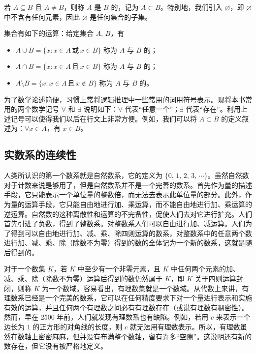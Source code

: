 \documentclass[UTF8,12pt,a4paper,fontset=fandol]{ctexbook}
\begin{document}
若 $A\subseteq B$ 且 $A\ne B$，则称 $A$ 是 $B$ 的，记为 $A\subset B$。特别地，我们引入 $\varnothing$，即 $\varnothing$ 中不含有任何元素，因此 $\varnothing$ 是任何集合的子集。


集合有如下的运算：给定集合 $A,\, B$，有
\begin{itemize}
  \item $A\cup B=\{x:x\in A \,\text{或}\, x\in B\}$ 称为 $A$ 与 $B$ 的；
  \item $A\cap B=\{x:x\in A\,\text{且}\,x\in B\}$ 称为 $A$ 与 $B$ 的；
  \item $A\setminus B=\{x:x\in A\,\text{且}\,x\notin B\}$ 称为 $A$ 与 $B$ 的。
\end{itemize}


为了数学论述简便，习惯上常将逻辑推理中一些常用的词用符号表示。现将本书常用的两个数学记号 $\forall$ 和 $\exists$ 说明如下：$\forall$ 代表“任意一个”；$\exists$ 代表“存在”。利用上述记号可以使得我们以后在行文上非常方便。例如，我们可以将 $A\subset B$ 的定义叙述为：$\forall x\in A$，有 $x\in B$。


\subsection{实数系的连续性}
人类所认识的第一个数系就是自然数系，它的定义为 $\{0,\,1,\,2,\,3,\,\cdots\}$。虽然自然数对于计数来说是够用了，但是自然数系并不是一个完善的数系。首先作为量的描述手段，它只能表示一个单位量的整数倍，而无法去表示此单位量的部分。此外，作为量的运算手段，它只能自由地进行加、乘运算，而不能自由地进行加、乘运算的逆运算。自然数的这种离散性和运算的不完备性，促使人们去对它进行扩充。人们首先引进了负数，得到了整数系。对整数系人们可以自由进行加、减运算。人们为了得到可以自由地进行加、减、乘、除四则运算的数系，对整数系中的任意两个数进行加、减、乘、除（除数不为零）得到的数的全体记为一个新的数系，这就是随后得到的。


对于一个数集 $K$，若 $K$ 中至少有一个非零元素，且 $K$ 中任何两个元素的加、减、乘、除（除数不为零）运算后得到的数仍然属于 $K$，即 $K$ 关于四则运算封闭，则称 $K$ 为一个数域。容易看出，有理数集就是一个数域。从代数上来讲，有理数系已经是一个完美的数系，它可以在任何精度要求下对一个量进行表示和实施有效的运算，并且任何两个有理数之间必有有理数存在（或说有理数有稠密性）。然而，早在 2500 年前，人们就发现有理数系也有缺陷。例如，若用 $c$ 来表示一个边长为 $1$ 的正方形的对角线的长度，则 $c$ 就无法用有理数表示。所以，有理数虽然在数轴上密密麻麻，但并没有布满整个数轴，留有许多“空隙”。这说明还有新的数存在，但它没有被严格地定义。
\end{document}

